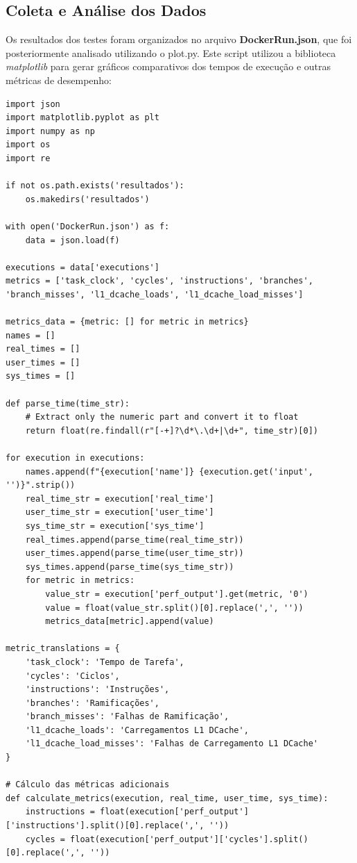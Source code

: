 \documentclass[12pt]{article}
\begin{document}
\subsection{Coleta e Análise dos Dados}
Os resultados dos testes foram organizados no arquivo \textbf{DockerRun.json}, que foi posteriormente analisado utilizando o plot.py. Este script utilizou a biblioteca \textit{matplotlib} para gerar gráficos comparativos dos tempos de execução e outras métricas de desempenho:

\begin{verbatim}
import json
import matplotlib.pyplot as plt
import numpy as np
import os
import re

if not os.path.exists('resultados'):
    os.makedirs('resultados')

with open('DockerRun.json') as f:
    data = json.load(f)

executions = data['executions']
metrics = ['task_clock', 'cycles', 'instructions', 'branches', 'branch_misses', 'l1_dcache_loads', 'l1_dcache_load_misses']

metrics_data = {metric: [] for metric in metrics}
names = []
real_times = []
user_times = []
sys_times = []

def parse_time(time_str):
    # Extract only the numeric part and convert it to float
    return float(re.findall(r"[-+]?\d*\.\d+|\d+", time_str)[0])

for execution in executions:
    names.append(f"{execution['name']} {execution.get('input', '')}".strip())
    real_time_str = execution['real_time']
    user_time_str = execution['user_time']
    sys_time_str = execution['sys_time']
    real_times.append(parse_time(real_time_str)) 
    user_times.append(parse_time(user_time_str)) 
    sys_times.append(parse_time(sys_time_str))   
    for metric in metrics:
        value_str = execution['perf_output'].get(metric, '0')
        value = float(value_str.split()[0].replace(',', ''))
        metrics_data[metric].append(value)

metric_translations = {
    'task_clock': 'Tempo de Tarefa',
    'cycles': 'Ciclos',
    'instructions': 'Instruções',
    'branches': 'Ramificações',
    'branch_misses': 'Falhas de Ramificação',
    'l1_dcache_loads': 'Carregamentos L1 DCache',
    'l1_dcache_load_misses': 'Falhas de Carregamento L1 DCache'
}

# Cálculo das métricas adicionais
def calculate_metrics(execution, real_time, user_time, sys_time):
    instructions = float(execution['perf_output']['instructions'].split()[0].replace(',', ''))
    cycles = float(execution['perf_output']['cycles'].split()[0].replace(',', ''))
    

\end{verbatim}
\end{document}

